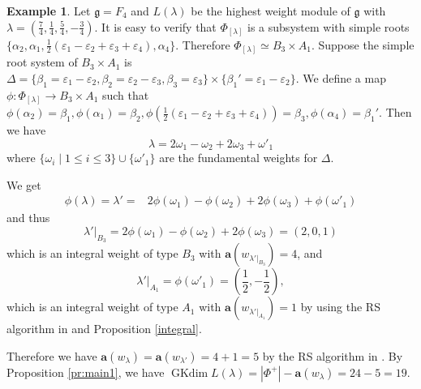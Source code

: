 \documentclass[reqno,12pt]{amsart}
\numberwithin{equation}{section}
\theoremstyle{plain}
\theoremstyle{definition}
\newtheorem{ex}[Thm]{Example}
\newcommand{\lam}{\lambda}
\newcommand{\ep}{\varepsilon}
\newcommand{\Ann}{\mathrm{Ann}}
\newcommand{\mf}[1]{\mathfrak{#1}}
\newcommand{\aff}{ \mathbf{a} }
\newcommand{\gkd}{\operatorname{GKdim}}
\renewcommand{\leq}{\leqslant}
\begin{document}
\begin{ex}
	Let $\mathfrak{g}=F_4$ and $L(\lam)$ be the highest weight module of $\mathfrak{g}$ with  $\lambda=(\frac{7}{4}, \frac{1}{4}, \frac{5}{4}, -\frac{3}{4})$. It is easy to verify that $\Phi_{[\lambda]}$ is a subsystem with simple roots $\{ \alpha_2,\alpha_1, \frac{1}{2}(\ep_1-\ep_2+\ep_3+\ep_4), \alpha_4\}$. Therefore $\Phi_{[\lambda]}\simeq B_3\times A_1$. Suppose the simple root system of $B_3\times A_1$ is $\Delta=\{\beta_1=\ep_1-\ep_2, \beta_2=\ep_2-\ep_3, \beta_3=\ep_3\}\times \{\beta_1'=\ep_1-\ep_2\}$. We define a map $\phi: \Phi_{[\lambda]} \rightarrow B_3\times A_1$ such that $\phi(\alpha_2)=\beta_1, \phi(\alpha_1)=\beta_2, \phi(\frac{1}{2}(\ep_1-\ep_2+\ep_3+\ep_4))=\beta_3, \phi(\alpha_4)=\beta_1'$. 
 Then we have 
$$\lambda=2\omega_1-\omega_2+2\omega_3+\omega'_1$$
    where $\{\omega_i\mid 1\leq i\leq 3\}\cup \{\omega'_1\}$ are the fundamental weights for $\Delta$. 

We get  
 \begin{align*}
     \phi(\lam)=\lambda'=& 2\phi(\omega_1)-\phi(\omega_2)+2\phi(\omega_3)+\phi(\omega'_1)
 \end{align*}
and thus $$\lam'|_{B_3}=2\phi(\omega_1)-\phi(\omega_2)+2\phi(\omega_3)=(2,0,1)$$
 which is an integral weight of type  $B_3$ with $\aff(w_{\lam'|_{{B_3}}})=4$, and $$\lam'|_{A_1}=\phi(\omega'_1)=(\frac{1}{2},-\frac{1}{2}),$$
 which is an integral weight of type  $A_1$ with $\aff(w_{\lam'|_{{A_1}}})=1$ by using  the RS algorithm in \cite{BXX} and Proposition \ref{integral}.

 
 Therefore we have  $\aff(w_{\lambda})=\aff(w_{\lambda'})=4+1=5$ by the RS algorithm in \cite{BXX}.
 By Proposition \ref{pr:main1},  we have $\gkd L(\lambda)=|\Phi^+|-\aff(w_{\lambda})=24-5=19$. 
\end{ex}





\end{document}
